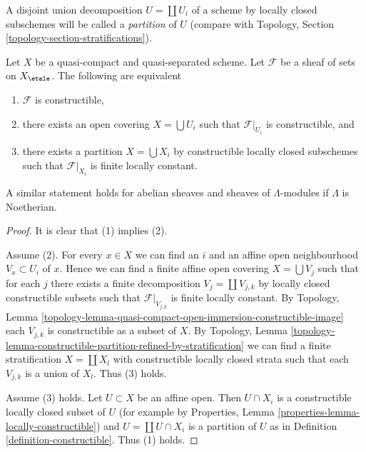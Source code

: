 \medskip\noindent
A disjoint union decomposition $U = \coprod U_i$ of a scheme by
locally closed subschemes will be called a {\it partition} of $U$
(compare with Topology, Section \ref{topology-section-stratifications}).

\begin{lemma}
\label{lemma-constructible-quasi-compact-quasi-separated}
Let $X$ be a quasi-compact and quasi-separated scheme. Let $\mathcal{F}$
be a sheaf of sets on $X_\etale$. The following are equivalent
\begin{enumerate}
\item $\mathcal{F}$ is constructible,
\item there exists an open covering $X = \bigcup U_i$ such that
$\mathcal{F}|_{U_i}$ is constructible, and
\item there exists a partition $X = \bigcup X_i$ by constructible
locally closed subschemes such that $\mathcal{F}|_{X_i}$ is finite
locally constant.
\end{enumerate}
A similar statement holds for abelian sheaves and sheaves of
$\Lambda$-modules if $\Lambda$ is Noetherian.
\end{lemma}

\begin{proof}
It is clear that (1) implies (2).

\medskip\noindent
Assume (2). For every $x \in X$ we can find an $i$ and an affine open
neighbourhood $V_x \subset U_i$ of $x$. Hence we can find a finite
affine open covering $X = \bigcup V_j$ such that for each $j$ there
exists a finite decomposition $V_j = \coprod V_{j, k}$ by locally closed
constructible subsets such that $\mathcal{F}|_{V_{j, k}}$ is finite
locally constant. By Topology, Lemma
\ref{topology-lemma-quasi-compact-open-immersion-constructible-image}
each $V_{j, k}$ is constructible as a subset of $X$.
By Topology, Lemma
\ref{topology-lemma-constructible-partition-refined-by-stratification}
we can find a finite stratification $X = \coprod X_l$ with constructible
locally closed strata such that each
$V_{j, k}$ is a union of $X_l$. Thus (3) holds.

\medskip\noindent
Assume (3) holds. Let $U \subset X$ be an affine open.
Then $U \cap X_i$ is a constructible locally closed subset of $U$
(for example by Properties, Lemma \ref{properties-lemma-locally-constructible})
and $U = \coprod U \cap X_i$ is a partition of $U$ as in
Definition \ref{definition-constructible}. Thus (1) holds.
\end{proof}

